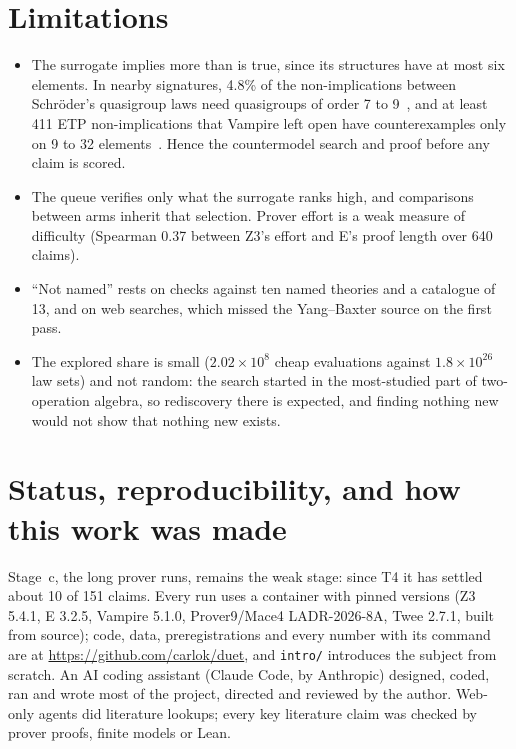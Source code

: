 \documentclass[11pt]{article}
\begin{document}
\section{Limitations}
\begin{itemize}
\item The surrogate implies more than is true, since its structures have at most six elements. In nearby signatures,
  4.8\% of the non-implications between Schr\"oder's quasigroup laws need quasigroups of order 7 to
  9~\cite{quadratula}, and at least 411 ETP non-implications that Vampire left open have counterexamples only on 9 to
  32 elements~\cite{parsimagma}. Hence the countermodel search and proof before any claim is scored.
\item The queue verifies only what the surrogate ranks high, and comparisons between arms inherit that selection.
  Prover effort is a weak measure of difficulty (Spearman 0.37 between Z3's effort and E's proof length over 640
  claims).
\item ``Not named'' rests on checks against ten named theories and a catalogue of 13, and on web searches, which
  missed the Yang--Baxter source on the first pass.
\item The explored share is small ($2.02\times10^{8}$ cheap evaluations against $1.8\times10^{26}$ law sets) and not
  random: the search started in the most-studied part of two-operation algebra, so rediscovery there is expected, and
  finding nothing new would not show that nothing new exists.
\end{itemize}

\section*{Status, reproducibility, and how this work was made}
Stage~c, the long prover runs, remains the weak stage: since T4 it has settled about 10 of 151 claims. Every run uses
a container with pinned versions (Z3 5.4.1, E 3.2.5, Vampire 5.1.0, Prover9/Mace4 LADR-2026-8A, Twee 2.7.1, built
from source); code, data, preregistrations and every number with its command are at
\url{https://github.com/carlok/duet}, and \texttt{intro/} introduces the subject from scratch. An AI coding assistant
(Claude Code, by Anthropic) designed, coded, ran and wrote most of the project, directed and reviewed by the author.
Web-only agents did literature lookups; every key literature claim was checked by prover proofs, finite models or
Lean.

{\small}
\end{document}
